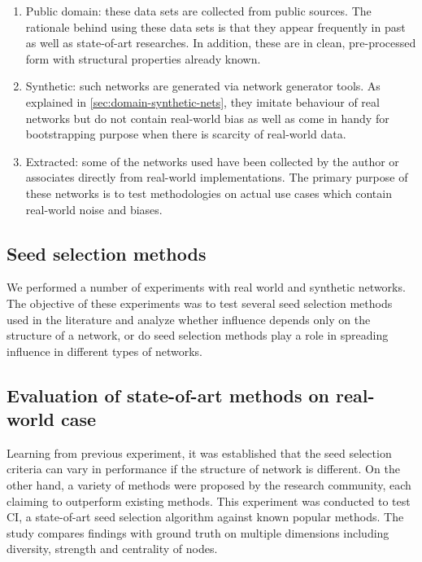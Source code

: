 		\begin{enumerate}
			\item Public domain: these data sets are collected from public sources. The rationale behind using these data sets is that they appear frequently in past as well as state-of-art researches. In addition, these are in clean, pre-processed form with structural properties already known.
			
			\item Synthetic: such networks are generated via network generator tools. As explained in \ref{sec:domain-synthetic-nets}, they imitate behaviour of real networks but do not contain real-world bias as well as come in handy for bootstrapping purpose when there is scarcity of real-world data.
						
			\item Extracted: some of the networks used have been collected by the author or associates directly from real-world implementations. The primary purpose of these networks is to test methodologies on actual use cases which contain real-world noise and biases.			
		\end{enumerate}
	
		\subsection{Seed selection methods}
		We performed a number of experiments with real world and synthetic networks. The objective of these experiments was to test several seed selection methods used in the literature and analyze whether influence depends only on the structure of a network, or do seed selection methods play a role in spreading influence in different types of networks.
		
		\subsection{Evaluation of state-of-art methods on real-world case}
		Learning from previous experiment, it was established that the seed selection criteria can vary in performance if the structure of network is different. On the other hand, a variety of methods were proposed by the research community, each claiming to outperform existing methods. This experiment was conducted to test CI, a state-of-art seed selection algorithm against known popular methods. The study compares findings with ground truth on multiple dimensions including diversity, strength and centrality of nodes.

